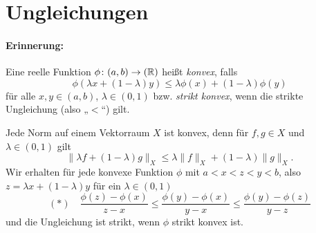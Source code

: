 \documentclass[skript.tex]{subfiles}
\begin{document}
	\section{Ungleichungen}
	\paragraph{Erinnerung:} Eine reelle Funktion $\phi\colon(a,b)\to(\mathbb{R})$ heißt \emph{konvex}, falls
	\[
		\phi(\lambda x + (1-\lambda)y) \leq \lambda \phi(x) + (1-\lambda) \phi(y)
	\]
	für alle $x,y \in (a,b)$, $\lambda\in(0,1)$ bzw. \emph{strikt konvex}, wenn die strikte Ungleichung (also „$<$“) gilt.
	\begin{center}
	\end{center}
	Jede Norm auf einem Vektorraum $X$ ist konvex, denn für $f,g \in X$ und $\lambda \in (0,1)$ gilt
	\[
		\lVert \lambda f+(1-\lambda)g \rVert_X \leq \lambda \lVert f \rVert_X + (1-\lambda) \lVert g \rVert_X.
	\]
	Wir erhalten für jede konvexe Funktion $\phi$ mit $a<x<z<y<b$, also $z=\lambda x+(1-\lambda)y$ für ein $\lambda\in(0,1)$
	\[
		(\ast)\quad
		\frac{\phi(z)-{\phi(x)}}{z-x}
		\leq \frac{\phi(y)-{\phi(x)}}{y-x}
		\leq \frac{\phi(y)-{\phi(z)}}{y-z}
	\]
	und die Ungleichung ist strikt, wenn $\phi$ strikt konvex ist.
	
\end{document}
